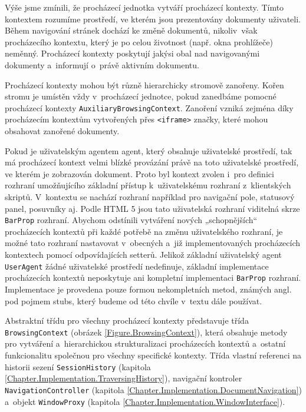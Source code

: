 Výše jsme zmínili, že procházecí jednotka vytváří procházecí kontexty. Tímto kontextem rozumíme prostředí, ve kterém jsou prezentovány dokumenty uživateli. Během navigování stránek dochází ke změně dokumentů, nikoliv~však procházecího kontextu, který je po celou životnost (např. okna prohlížeče) neměnný. Procházecí kontexty poskytují jakýsi obal nad navigovanými dokumenty a~informují o~právě aktivním dokumentu.

Procházecí kontexty mohou být různě hierarchicky stromově zanořeny. Kořen stromu je umístěn vždy v~procházecí jednotce, pokud zanedbáme pomocné procházecí kontexty \texttt{AuxiliaryBrowsingContext}. Zanoření vzniká zejména díky procházecím kontextům vytvořených přes \texttt{<iframe>} značky, které mohou obsahovat zanořené dokumenty.

Pokud je uživatelským agentem agent, který obsahuje uživatelské prostředí, tak má procházecí kontext velmi blízké provázání právě na toto uživatelské prostředí, ve kterém je zobrazován dokument. Proto byl kontext zvolen i~pro definici rozhraní umožňujícího základní přístup k~uživatelskému rozhraní z~klientských skriptů. V~kontextu se nachází rozhraní například pro navigační pole, statusový panel, posuvníky aj. Podle HTML 5 jsou tato uživatelská rozhraní viditelná skrze \texttt{BarProp} rozhraní. Abychom odstínili vytváření nových „schopnějších“ procházecích kontextů při každé potřebě na změnu uživatelského rozhraní, je možné tato rozhraní nastavovat v~obecných a~již implementovaných procházecích kontextech pomocí odpovídajících setterů. Jelikož základní uživatelský agent \texttt{UserAgent} žádné uživatelské prostředí nedefinuje, základní implementace procházecích kontextů neposkytuje ani kompletní implementaci \texttt{BarProp} rozhraní. Implementace je provedena pouze formou nekompletních metod, známých angl. pod pojmem stubs, který budeme od této chvíle v~textu dále používat.

Abstraktní třídu pro všechny procházecí kontexty představuje třída \texttt{BrowsingContext} (obrázek \ref{Figure.BrowsingContext}), která obsahuje metody pro vytváření a~hierarchickou strukturalizaci procházecích kontextů a~ostatní funkcionalitu společnou pro všechny specifické kontexty. Třída vlastní referenci na historii sezení \texttt{SessionHistory} (kapitola \ref{Chapter.Implementation.TraversingHistory}), navigační kontroler \texttt{NavigationController} (kapitola \ref{Chapter.Implementation.DocumentNavigation}) a~objekt \texttt{WindowProxy} (kapitola \ref{Chapter.Implementation.WindowInterface}).

